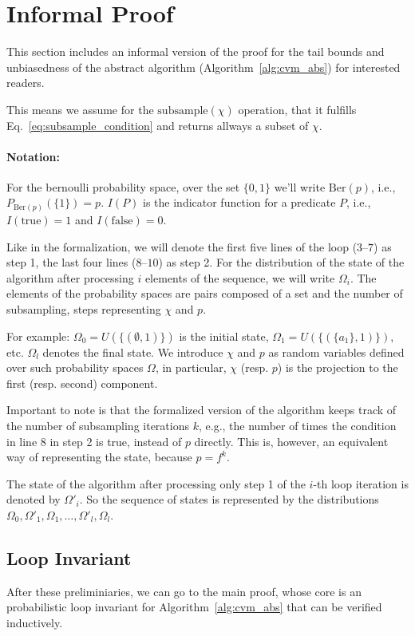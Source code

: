 \section{Informal Proof}
This section includes an informal version of the proof for the tail bounds and unbiasedness
of the abstract algorithm (Algorithm~\ref{alg:cvm_abs}) for interested readers.

This means we assume for the $\mathrm{subsample}(\chi)$ operation, that it fulfills 
Eq.~\ref{eq:subsample_condition} and returns allways a subset of $\chi$.

\paragraph{Notation:} For the bernoulli probability space, over the set $\{0,1\}$ we'll write 
$\mathrm{Ber}(p)$, i.e., $P_{\mathrm{Ber}(p)}(\{1\}) = p$. $I(P)$ is the indicator function for a 
predicate $P$, i.e., $I(\mathrm{true}) = 1$ and $I(\mathrm{false}) = 0$.

Like in the formalization, we will denote the first five lines of the loop ($3$--$7$) as step 1, 
the last four lines ($8$--$10$) as step 2. For the distribution of the state of the algorithm after
processing $i$ elements of the sequence, we will write $\Omega_i$.
The elements of the probability spaces are pairs composed of a set and the number of subsampling, 
steps representing $\chi$ and $p$.

For example: $\Omega_0 = U(\{(\emptyset, 1)\})$ is the initial state, 
$\Omega_1 = U(\{(\{a_1\}, 1)\})$, etc. $\Omega_l$ denotes the final state.
We introduce $\chi$ and $p$ as random variables defined over such probability spaces $\Omega$, 
in particular, $\chi$ (resp. $p$) is the projection to the first (resp. second) component.

Important to note is that the formalized version of the algorithm keeps track of the number of
subsampling iterations $k$, e.g., the number of times the condition in line 8 in step 2 is true,
instead of $p$ directly. This is, however, an equivalent way of representing the state, because 
$p = f^k$.

The state of the algorithm after processing only step 1 of the $i$-th loop iteration is denoted by 
$\Omega'_i$. So the sequence of states is represented by the distributions 
$\Omega_0, \Omega'_1, \Omega_1, \ldots, \Omega'_l, \Omega_l$.

\subsection{Loop Invariant}
After these preliminiaries, we can go to the main proof, whose core is an probabilistic loop
invariant for Algorithm~\ref{alg:cvm_abs} that can be verified inductively.

